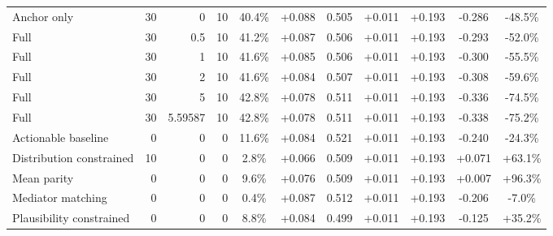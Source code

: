 \begin{table}[htbp]
\begin{tabular}{lrrrccccccc}
Anchor only & 30 & 0 & 10 & 40.4\% & +0.088 & 0.505 & +0.011 & +0.193 & -0.286 & -48.5\% \\
Full & 30 & 0.5 & 10 & 41.2\% & +0.087 & 0.506 & +0.011 & +0.193 & -0.293 & -52.0\% \\
Full & 30 & 1 & 10 & 41.6\% & +0.085 & 0.506 & +0.011 & +0.193 & -0.300 & -55.5\% \\
Full & 30 & 2 & 10 & 41.6\% & +0.084 & 0.507 & +0.011 & +0.193 & -0.308 & -59.6\% \\
Full & 30 & 5 & 10 & 42.8\% & +0.078 & 0.511 & +0.011 & +0.193 & -0.336 & -74.5\% \\
Full & 30 & 5.59587 & 10 & 42.8\% & +0.078 & 0.511 & +0.011 & +0.193 & -0.338 & -75.2\% \\
Actionable baseline & 0 & 0 & 0 & 11.6\% & +0.084 & 0.521 & +0.011 & +0.193 & -0.240 & -24.3\% \\
Distribution constrained & 10 & 0 & 0 & 2.8\% & +0.066 & 0.509 & +0.011 & +0.193 & +0.071 & +63.1\% \\
Mean parity & 0 & 0 & 0 & 9.6\% & +0.076 & 0.509 & +0.011 & +0.193 & +0.007 & +96.3\% \\
Mediator matching & 0 & 0 & 0 & 0.4\% & +0.087 & 0.512 & +0.011 & +0.193 & -0.206 & -7.0\% \\
Plausibility constrained & 0 & 0 & 0 & 8.8\% & +0.084 & 0.499 & +0.011 & +0.193 & -0.125 & +35.2\% \\
\bottomrule
\end{tabular}
\end{table}